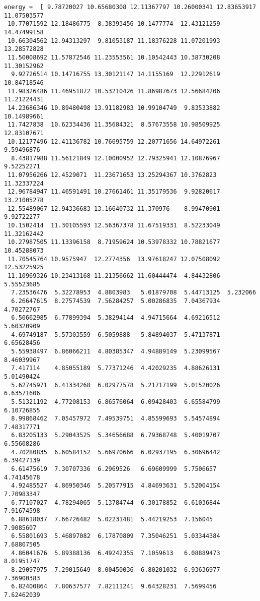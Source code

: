 \documentclass[11pt]{article}
\begin{document}
\begin{Verbatim}[commandchars=\\\{\}]
energy =  [ 9.78720027 10.65680308 12.11367797 10.26000341 12.83653917 11.07503577
 10.77071592 12.18486775  8.38393456 10.1477774  12.43121259 14.47499158
 10.66304562 12.94313297  9.81053187 11.18376228 11.07201993 13.28572828
 11.50008692 11.57872546 11.23553561 10.10542443 10.38730208 11.30152962
  9.92726514 10.14716755 13.30121147 14.1155169  12.22912619 10.84718546
 11.98326486 11.46951872 10.53210426 11.86987673 12.56684206 11.21224431
 14.23686346 10.89480498 13.91182983 10.99104749  9.83533882 10.14989661
 11.7427838  10.62334436 11.35684321  8.57673558 10.98509925 12.83107671
 10.12177496 12.41136782 10.76695759 12.20771656 14.64972261  9.59496876
  8.43817988 11.56121849 12.10000952 12.79325941 12.10876967  9.52252271
 11.07956266 12.4529071  11.23671653 13.25294367 10.3762823  11.32337224
 12.96784947 11.46591491 10.27661461 11.35179536  9.92820617 13.21005278
 12.55489067 12.94336683 13.16640732 11.370976    8.99470901  9.92722277
 10.1502414  11.30105593 12.56367378 11.67519331  8.52233049 11.32162442
 10.27987505 11.13396158  8.71959624 10.53978332 10.78821677 10.45288073
 11.70545764 10.9575947  12.2774356  13.97618247 12.07508092 12.53225925
 11.10969326 10.23413168 11.21356662 11.60444474  4.84432806  5.55523685
  7.23536476  5.32278953  4.8803983   5.01879708  5.44713125  5.232066
  6.26647615  8.27574539  7.56284257  5.00286835  7.04367934  4.70272767
  6.50662985  6.77899394  5.38294144  4.94715664  4.69216512  5.60320909
  4.69749187  5.57303559  6.5059888   5.84894037  5.47137871  6.65628456
  5.55938497  6.86066211  4.80385347  4.94889149  5.23099567  8.46039967
  7.417114    4.85055189  5.77371246  4.42029235  4.88626131  5.01490424
  5.62745971  6.41334268  6.02977578  5.21717199  5.01520026  6.63571606
  5.51321192  4.77208153  6.86576064  6.09428403  6.65584799  6.10726855
  8.99868462  7.05457972  7.49539751  4.85599693  5.54574894  7.48317771
  6.83205133  5.29043525  5.34656688  6.79368748  5.40019707  6.55608286
  4.70280835  6.60584152  5.66970666  6.02937195  6.30696442  6.39427139
  6.61475619  7.30707336  6.2969526   6.69609999  5.7506657   4.74145678
  4.92485527  4.86950346  5.20577915  4.84693631  5.52004154  7.70983347
  6.77107027  4.78294065  5.13784744  6.30178852  6.61036844  7.91674598
  6.88618037  7.66726482  5.02231481  5.44219253  7.156045    7.9085607
  6.55801693  5.46897082  6.17870809  7.35046251  5.03344384  7.68807505
  4.86041676  5.89388136  6.49242355  7.1059613   6.08889473  8.01951747
  8.29097975  7.29015649  8.00450036  6.80201032  6.93636977  7.36900383
  6.82400864  7.80637577  7.82111241  9.64328231  7.5699456   7.62462039

\end{Verbatim}
\end{document}
